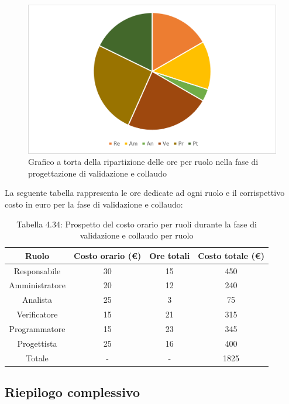 \begin{figure}[H]
    \centering
    \includegraphics[scale=0.6]{img/grafi preventivo/torta/validazione/complessivo.png}
    \caption{Grafico a torta della ripartizione delle ore per ruolo nella fase di progettazione di validazione e collaudo}
\end{figure}
La seguente tabella rappresenta le ore dedicate ad ogni ruolo e il corrispettivo costo in euro per la fase di validazione e collaudo:
\begin{table}[h]
	\setlength\extrarowheight{5pt}
	\centering
	\begin{tabularx}{\textwidth}{|ccc|c|}
		\hline
		\rowcolor{white}
		\textbf{Ruolo} & \textbf{Costo orario (€)} & \textbf{Ore totali} & \textbf{Costo totale (€)} \\
		\hline
		Responsabile &30&15&450 \\
		Amministratore &20&12&240 \\
		Analista &25&3&75 \\
		Verificatore &15&21&315 \\
		Programmatore &15&23&345 \\
		Progettista &25&16&400 \\
		\hline
		Totale &-&-&1825 \\
		\hline
	\end{tabularx}
    \vspace{10pt}
	\caption{Tabella 4.34: Prospetto del costo orario per ruoli durante la fase di validazione e collaudo per ruolo}
\end{table}
%

\newpage
\subsection{Riepilogo complessivo}
%
